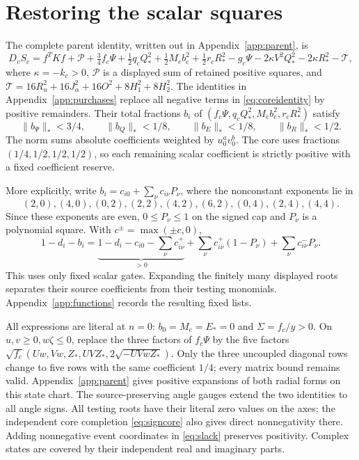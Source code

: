 \documentclass[10pt]{article}
\newcommand{\half}{\tfrac12}
\newcommand{\bc}{b_{\mathrm c}}
\newcommand{\Zc}{Z_*}
\newcommand{\Qh}{Q_*}
\newcommand{\Rh}{R_*}
\newcommand{\Ps}{\Psi}
\newcommand{\calP}{\mathcal P}
\begin{document}
\section{Restoring the scalar squares}
The complete parent identity, written out in Appendix~\ref{app:parent}, is
\begin{equation}
 D_vS_c=f^TKf+\calP+
 \tfrac34 f_c\Ps+\half q_c\Qh^2+\half M_e\bc^2+\half r_c\Rh^2
       -g_c\Ps-2\kappa V^2\Qh^2-2\kappa\Rh^2-\mathcal T ,
 \label{eq:coreidentity}
\end{equation}
where $\kappa=-k_c>0$, $\calP$ is a displayed sum of retained positive
squares, and
$\mathcal T=16R_u^2+16J_\alpha^2+16O^2+8H_1^2+8H_2^2$.
The identities in Appendix~\ref{app:purchases} replace all negative terms
in \eqref{eq:coreidentity} by positive remainders. Their total fractions
$b_i$ of $(f_c\Ps,q_c\Qh^2,M_e\bc^2,r_c\Rh^2)$ satisfy
\begin{equation}
 \|b_\Ps\|_*<3/4,\qquad \|b_Q\|_*<1/8,\qquad
 \|b_E\|_*<1/8,\qquad \|b_R\|_*<1/2 .
 \label{eq:totalbounds}
\end{equation}
The norm sums absolute coefficients weighted by $u_0^av_0^b$.
The core uses fractions $(1/4,1/2,1/2,1/2)$, so each remaining scalar
coefficient is strictly positive with a fixed coefficient reserve.

More explicitly, write $b_i=c_{i0}+\sum_\nu c_{i\nu}P_\nu$, where the
nonconstant exponents lie in
\[
 (2,0),(4,0),(0,2),(2,2),(4,2),(6,2),(0,4),(2,4),(4,4).
\]
Since these exponents are even, $0\leq P_\nu\leq1$ on the signed cap and
$P_\nu$ is a polynomial square. With $c^\pm=\max(\pm c,0)$,
\[
 1-d_i-b_i=
 \underbrace{1-d_i-c_{i0}-\sum_\nu c_{i\nu}^+}_{>0}
 +\sum_\nu c_{i\nu}^+(1-P_\nu)+\sum_\nu c_{i\nu}^-P_\nu .
\]
This uses only fixed scalar gates. Expanding the finitely many displayed
roots separates their source coefficients from their testing monomials.
Appendix~\ref{app:functions} records the resulting fixed lists.

All expressions are literal at $n=0$: $b_0=M_e=E_*=0$ and
$\Sigma=f_c/y>0$. On $u,v\geq0,w\zeta\leq0$, replace the three factors
of $f_c\Ps$ by the five factors
$\sqrt{f_c}(Uw,Vw,\Zc,UV\Zc,2\sqrt{-UVw\Zc})$.
Only the three uncoupled diagonal rows change to five rows with the same
coefficient $1/4$; every matrix bound remains valid.
Appendix~\ref{app:parent} gives positive expansions of both radial forms
on this state chart. The source-preserving angle gauges extend the two
identities to all angle signs. All testing roots have their literal zero
values on the axes; the independent core completion \eqref{eq:signcore}
also gives direct nonnegativity there.
Adding nonnegative event coordinates in \eqref{eq:slack} preserves positivity.
Complex states are covered by their independent real and imaginary parts.
\end{document}
